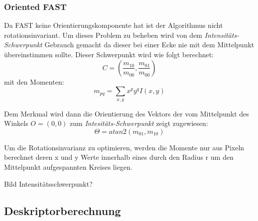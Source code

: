 \subsubsection{Oriented FAST}
Da FAST keine Orientierungskomponente hat ist der Algorithmus nicht rotationsinvariant.
Um dieses Problem zu beheben wird von dem \emph{Intensitäts-Schwerpunkt} Gebrauch gemacht da dieser bei einer Ecke nie mit dem Mittelpunkt übereinstimmen sollte.
Dieser Schwerpunkt wird wie folgt berechnet:
\begin{equation}
C = (\dfrac{m_{10}}{m_{00}}, \dfrac{m_{01}}{m_{00}})
\end{equation}
mit den Momenten:
\begin{equation}
m_{pq} = \sum_{x,y}x^p y^q I(x,y)
\end{equation}

Dem Merkmal wird dann die Orientierung des Vektors der vom Mittelpunkt des Winkels $O=(0,0)$ zum \emph{Intesitäts-Schwerpunkt} zeigt zugewiesen:
\begin{equation}
\Theta = atan2(m_{01},m_{10})
\end{equation}

Um die Rotationsinvarianz zu optimieren, werden die Momente nur aus Pixeln berechnet deren x und y Werte innerhalb eines durch den Radius r um den Mittelpunkt aufgespannten Kreises liegen.

Bild Intensitätsschwerpunkt?


\subsection{Deskriptorberechnung}

